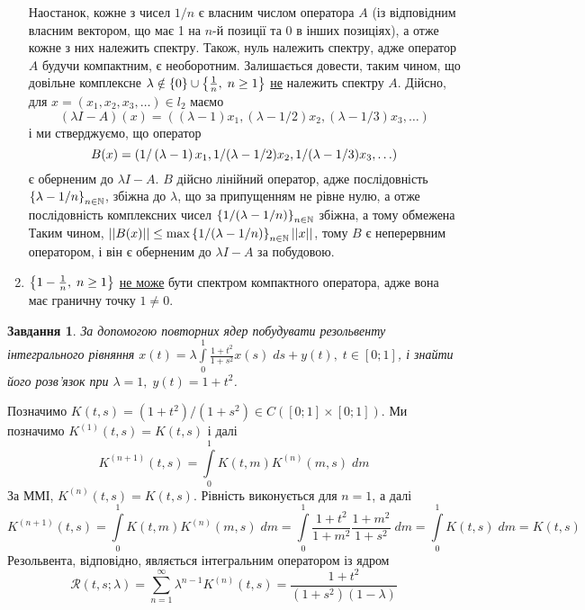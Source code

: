 \documentclass[10pt]{article}
\newtheorem{prob}{Завдання}
\newcommand{\ds}{\;ds}
\let\oldint\int
\renewcommand{\int}{\oldint\limits}
\begin{document}
\begin{enumerate}
	Наостанок, кожне з чисел $1/n$ є власним числом оператора $A$ (із відповідним власним вектором, що має 1 на $n$-й позиції та 0 в інших
	позиціях), а отже кожне з них належить спектру. Також, нуль належить спектру, адже оператор $A$ будучи компактним, є необоротним. Залишається
	довести, таким чином, що довільне комплексне
	$\lambda\notin\left\{0\right\}\cup\left\{\frac{1}{n},\;n\geq1\right\}$ \uline{не} належить спектру $A$. Дійсно, для $x=(x_1,x_2,x_3,\hdots)\in l_2$
	маємо
	\[(\lambda I-A)(x)=((\lambda-1)x_1,(\lambda-1/2)x_2,(\lambda-1/3)x_3,\hdots)\]
	і ми стверджуємо, що оператор 
	\[B(x)=\left({1}/\left(\lambda-1\right)x_1,1/(\lambda-1/2)x_2,{1}/(\lambda-1/3)x_3,\hdots\right)\]
	є оберненим до $\lambda I-A$. $B$ дійсно лінійний оператор, адже послідовність $\left\{\lambda-1/n\right\}_{n\in\mathbb{N}}$, збіжна до $\lambda$,
	що за припущенням не рівне нулю, а отже послідовність комплексних чисел $\left\{1/(\lambda-1/n)\right\}_{n\in\mathbb{N}}$ збіжна, а тому обмежена
	Таким чином, $\mynorm{B(x)}\leq\max\mycbra{1/(\lambda-1/n)}_{n\in\mathbb{N}}\mynorm{x}$, тому $B$ є неперервним оператором, і він є оберненим
	до $\lambda I-A$ за побудовою.
\item $\left\{1-\frac{1}{n},\;n\geq1\right\}$ \uline{не може} бути спектром компактного оператора, адже вона має граничну точку $1\neq0$.
\end{enumerate}
\begin{prob}За допомогою повторних ядер побудувати резольвенту інтегрального рівняння $x(t)=\lambda\int_{0}^{1}\frac{1+t^2}{1+s^2}x(s)\ds+
	y(t),\;t\in[0;1]$, і знайти його розв’язок при $\lambda=1,\;y(t)=1+t^2$.\end{prob}
	\newcommand{\dm}{\;dm}
	Позначимо $K(t,s)=(1+t^2)/(1+s^2)\in C([0;1]\times[0;1])$. Ми позначимо $K^{(1)}(t,
	s)=K(t,s)$ і далі \[K^{(n+1)}(t,s)=\int_{0}^1 K(t,m)K^{(n)}(m,s)\;dm\]
	За ММІ, $K^{(n)}(t,s)=K(t,s)$. Рівність виконується для
	$n=1$, а далі
	\[K^{(n+1)}(t, s)=\int
	_{0}^1 K(t,m)K^{(n)}(m,s)\dm=\int_{0}^1\frac{1+t^2}{1+m^2}\frac{1+m^2}{1+s^2}\dm=\int_0^1K(t,s)\dm=K(t,s)\]
	Резольвента, відповідно, являється інтегральним оператором із ядром
	\[\mathcal{R}(t, s;\lambda)=\sum_{n=1}^\infty \lambda^{n-1}K^{(n)}(t, s)=\frac{1+t^2}{(1+s^2)(1-\lambda)}\]
\end{document}
